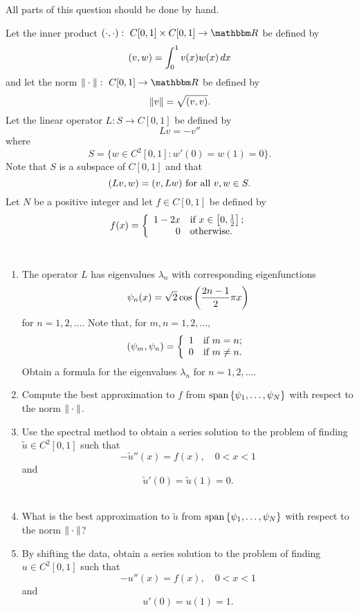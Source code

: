 
All parts of this question should be done by hand.

Let the inner product $\ip{\cdot,\cdot}:\mbox{ }C[0,1]\times C[0,1]\rightarrow\R$ be defined by
\[
(v,w)=\int_0^1v(x)w(x)\,dx
\]
and let the norm $\norm{\cdot}:\mbox{ }C[0,1]\rightarrow\R$ be defined by
\[
\|v\|=\sqrt{(v,v)}.
\]
Let the linear operator $L: S\to C[0,1]$ be defined by
\[
L v = -v''
\]
where
\[
S = \{ w \in C^2[0,1] : w'(0) = w(1) = 0\}.
\]
Note that $S$ is a subspace of $C[0,1]$ and that
\[
(Lv,w)=(v,Lw)\mbox{ for all }v,w\in S.
\]
Let $N$ be a positive integer and let $f\in C[0,1]$ be defined by
\[
f(x)=\left\{\begin{array}{rl}1-2x&\mbox{if }x\in\left[0,{1\over2}\right];\\0&\mbox{otherwise}.\end{array}\right.
\]
\\
\begin{enumerate}
\item The operator $L$ has eigenvalues $\lambda_n$ with corresponding eigenfunctions
\[
\psi_n(x) = \sqrt{2} \cos\left({2n-1\over 2}\pi x\right)
\]
for $n=1,2,\ldots$. Note that, for $m,n=1,2,\ldots$,
\[
(\psi_m,\psi_n)=\left\{\begin{array}{rl}1&\mbox{if }m=n;\\0&\mbox{if }m\ne n.\end{array}\right.
\]
Obtain a formula for the eigenvalues $\lambda_n$ for $n=1,2,\ldots$.
\\
\item Compute the best approximation to $f$ from ${\rm span}\left\{\psi_1,\ldots,\psi_N\right\}$ with respect to the norm $\|\cdot\|$.
\\
\item Use the spectral method to obtain a series solution to the problem of finding $\tilde{u}\in C^2[0,1]$ such that
\[
-\tilde{u}''(x) = f(x),\quad 0<x<1
\]
and
\[
\tilde{u}'(0) = \tilde{u}(1) = 0.
\]
\\
\item What is the best approximation to $\tilde{u}$ from ${\rm span}\left\{\psi_1,\ldots,\psi_N\right\}$ with respect to the norm $\|\cdot\|$?
\\
\item By shifting the data, obtain a series solution to the problem of finding $u\in C^2[0,1]$ such that
\[
-u''(x) = f(x),\quad 0<x<1
\]
and
\[
u'(0) = u(1) = 1.
\]
\end{enumerate}




